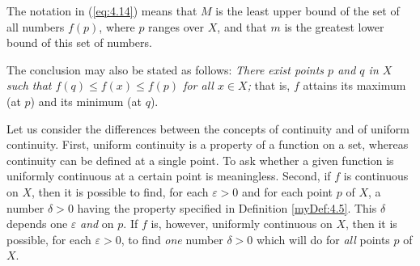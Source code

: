 The notation in (\ref{eq:4.14}) means that 
$M$ is the least upper bound of the set of all numbers $f(p)$, 
where $p$ ranges over $X$, 
and that $m$ is the greatest lower bound of this set of numbers.

The conclusion may also be stated as follows: 
\emph{There exist points $p$ and $q$
in $X$ such that $f(q) \leq f(x) \leq f(p)$ for all $x \in X$;} 
that is, $f$ attains its maximum (at $p$) and its minimum (at $q$).




Let us consider the differences between the concepts of continuity and of
uniform continuity. 
First, uniform continuity is a property of a function on a set, 
whereas continuity can be defined at a single point. 
To ask whether a given function is uniformly continuous at a certain point is meaningless. 
Second, if $f$ is continuous on $X$, 
then it is possible to find, 
for each $\varepsilon > 0$ and for each point $p$ of $X$, 
a number $\delta > 0$ having the property specified in Definition \ref{myDef:4.5}. 
This $\delta$ depends one $\varepsilon$ \emph{and} on $p$. 
If $f$ is, however, uniformly continuous on $X$, 
then it is possible, for each $\varepsilon > 0$, 
to find \emph{one} number $\delta > 0$ which will do for \emph{all} points $p$ of $X$.

